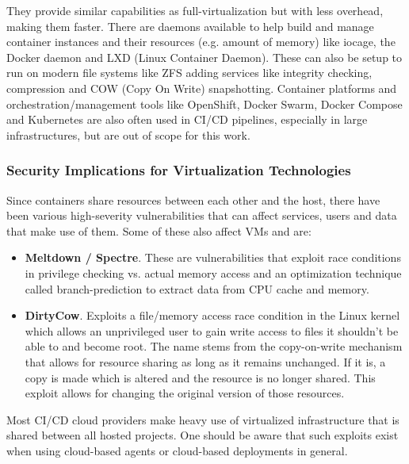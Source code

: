 They provide similar capabilities as full-virtualization but with less overhead, making them faster. There are daemons available to help build and manage container instances and their resources (e.g. amount of memory) like iocage\cite{iocage-zfs}, the Docker daemon\cite{arch-docker} and LXD\cite{dustin-lxc} (Linux Container Daemon). These can also be setup to run on modern file systems like ZFS adding services like integrity checking, compression and COW (Copy On Write) snapshotting.\cite{dustin-lxc} Container platforms and orchestration/management tools like OpenShift, Docker Swarm, Docker Compose and Kubernetes are also often used in CI/CD pipelines, especially in large infrastructures, but are out of scope for this work.\cite{openshift,docker-swarm,kubernetes}

\subsubsection{Security Implications for Virtualization Technologies}
Since containers share resources between each other and the host, there have been various high-severity vulnerabilities that can affect services, users and data that make use of them. Some of these also affect VMs and are:
\begin{itemize}
    \item \textbf{Meltdown / Spectre}. These are vulnerabilities that exploit race conditions in privilege checking vs. actual memory access and an optimization technique called branch-prediction to extract data from CPU cache and memory.\cite{meltdown,spectre} 
    \item \textbf{DirtyCow}. Exploits a file/memory access race condition in the Linux kernel which allows an unprivileged user to gain write access to files it shouldn't be able to and become root.\cite{dirty-cow} The name stems from the copy-on-write mechanism that allows for resource sharing as long as it remains unchanged. If it is, a copy is made which is altered and the resource is no longer shared. This exploit allows for changing the original version of those resources.
\end{itemize}
Most CI/CD cloud providers make heavy use of virtualized infrastructure that is shared between all hosted projects. One should be aware that such exploits exist when using cloud-based agents or cloud-based deployments in general.


